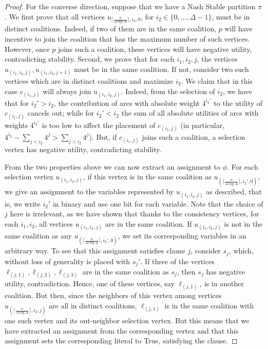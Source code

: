\documentclass[letterpaper,USenglish,cleveref, autoref, thm-restate]{lipics-v2021}
\begin{document}
\begin{proof}
For the converse direction, suppose that we have a Nash Stable partition $\pi$.
We first prove that all vertices
$u_{\lceil\frac{n}{\Delta\log\Delta}\rceil,i_2,0}$, for
$i_2\in\{0,\ldots,\Delta-1\}$, must be in distinct coalitions. Indeed, if two
of them are in the same coalition, $p$ will have incentive to join the
coalition that has the maximum number of such vertices. However, once $p$ joins
such a coalition, these vertices will have negative utility, contradicting
stability. Second, we prove that for each $i_1,i_2,j$, the vertices
$u_{(i_1,i_2,j)}, u_{(i_1,i_2,j+1)}$ must be in the same coalition. If not,
consider two such vertices which are in distinct coalitions and maximize $i_2$.
We claim that in this case $c_{(i_1,j)}$ will always join $u_{(i_1,i_2,j)}$.
Indeed, from the selection of $i_2$, we have that for $i_2'>i_2$, the
contribution of arcs with absolute weight $4^{i_2'}$ to the utility of
$c_{(i_1,j)}$ cancels out; while for $i_2'<i_2$ the sum of all absolute
utilities of arcs with weights $4^{i_2'}$ is too low to affect the placement of
$c_{(i_1,j)}$ (in particular, $4^{i_2}-\sum_{j<i_2} 4^j > \sum_{j<i_2} 4^j$).
But, if $c_{(i_1,j)}$ joins such a coalition, a selection vertex has negative
utility, contradicting stability.

From the two properties above we can now extract an assignment to $\phi$. For
each selection vertex $u_{(i_1,i_2,j)}$, if this vertex is in the same
coalition as $u_{(\lceil\frac{n}{\Delta\log\Delta}\rceil,i_2',0)}$, we give an
assignment to the variables represented by $u_{(i_1,i_2,j)}$ as described, that
is, we write $i_2'$ in binary and use one bit for each variable. Note that the
choice of $j$ here is irrelevant, as we have shown that thanks to the
consistency vertices, for each $i_1,i_2$, all vertices $u_{(i_1,i_2,j)}$ are in
the same coalition. If $u_{(i_1,i_2,j)}$ is not in the same coalition as any
$u_{(\lceil\frac{n}{\Delta\log\Delta}\rceil,i_2',0)}$, we set its corresponding
variables in an arbitrary way. To see that this assignment satisfies clause
$j$, consider $s_j$, which, without loss of generality is placed with $s_j'$.
If three of the vertices $\ell_{(j,1)}, \ell_{(j,2)}, \ell_{(j,3)}$ are in the
same coalition as $s_j$, then $s_j$ has negative utility, contradiction. Hence,
one of these vertices, say $\ell_{(j,1)}$, is in another coalition. But then,
since the neighbors of this vertex among vertices
$u_{(\lceil\frac{n}{\Delta\log\Delta}\rceil,i_2,j)}$ are all in distinct
coalitions, $\ell_{(j,1)}$ is in the same coalition with one such vertex and
its out-neighbor selection vertex. But this means that we have extracted an
assignment from the corresponding vertex and that this assignment sets the
corresponding literal to True, satisfying the clause.  \end{proof}
\end{document}
